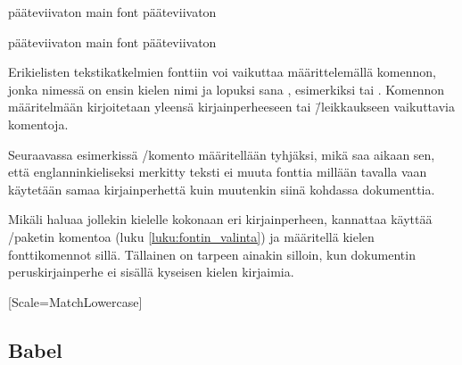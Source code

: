 \begin{koodilohkosis}
  \sffamily
  pääteviivaton \textenglish{main font} pääteviivaton
\end{koodilohkosis}

\begin{tulossis}
  \sffamily pääteviivaton {\rmfamily main font} pääteviivaton
\end{tulossis}

Erikielisten tekstikatkelmien fonttiin voi vaikuttaa määrittelemällä
komennon, jonka nimessä on ensin kielen nimi ja lopuksi sana
, esimerkiksi  tai . Komennon määritelmään kirjoitetaan yleensä
kirjainperheeseen tai \=/leikkaukseen vaikuttavia komentoja.

Seuraavassa esimerkissä \-/komento
määritellään tyhjäksi, mikä saa aikaan sen, että englanninkieliseksi
merkitty teksti ei muuta fonttia millään tavalla vaan käytetään samaa
kirjainperhettä kuin muutenkin siinä kohdassa dokumenttia.

\begin{koodilohkosis}
  \newcommand{\englishfont}{}
\end{koodilohkosis}

Mikäli haluaa jollekin kielelle kokonaan eri kirjainperheen, kannattaa
käyttää \-/paketin komentoa  (luku \ref{luku:fontin_valinta}) ja määritellä
kielen fonttikomennot sillä. Tällainen on tarpeen ainakin silloin, kun
dokumentin peruskirjainperhe ei sisällä kyseisen kielen kirjaimia.

\begin{koodilohkosis}
  [Scale=MatchLowercase]
\end{koodilohkosis}


%


\subsection{Babel}


